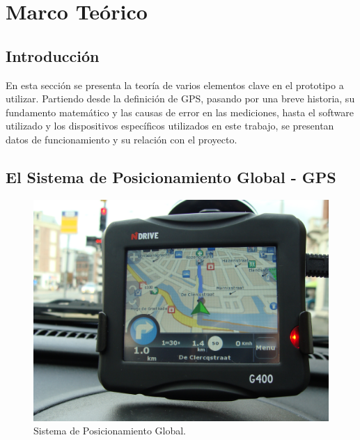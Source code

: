
\chapter{Marco Teórico} %

\label{Chap:Marco} %




\section{Introducción}

En esta sección se presenta la teoría de varios elementos clave en el prototipo a utilizar. Partiendo desde la definición de GPS, pasando por una breve historia, su fundamento matemático y las causas de error en las mediciones, hasta el software utilizado y los dispositivos específicos utilizados en este trabajo, se presentan datos de funcionamiento y su relación con el proyecto.

\section{El Sistema de Posicionamiento Global - GPS}

\begin{figure}[ht]
\centering
\includegraphics[scale=0.10]{Figures/GPS}
\caption[Sistema de Posicionamiento Global.]{Sistema de Posicionamiento Global.\footnotemark}
\label{fig:GPS}
\end{figure}


